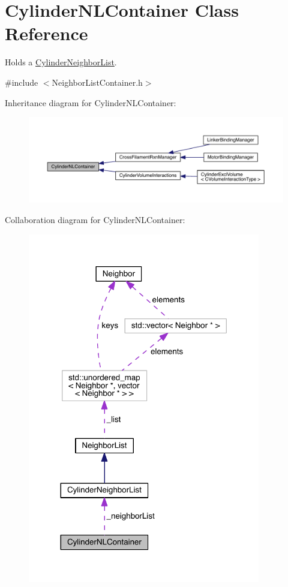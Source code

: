 \hypertarget{classCylinderNLContainer}{\section{Cylinder\+N\+L\+Container Class Reference}
\label{classCylinderNLContainer}
}


Holds a \hyperlink{classCylinderNeighborList}{Cylinder\+Neighbor\+List}.  




{\ttfamily \#include $<$Neighbor\+List\+Container.\+h$>$}



Inheritance diagram for Cylinder\+N\+L\+Container\+:\nopagebreak
\begin{figure}[H]
\begin{center}
\leavevmode
\includegraphics[width=350pt]{classCylinderNLContainer__inherit__graph}
\end{center}
\end{figure}


Collaboration diagram for Cylinder\+N\+L\+Container\+:\nopagebreak
\begin{figure}[H]
\begin{center}
\leavevmode
\includegraphics[width=287pt]{classCylinderNLContainer__coll__graph}
\end{center}
\end{figure}
